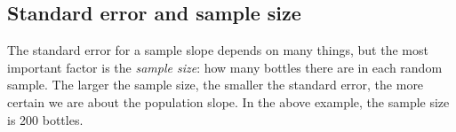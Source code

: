 \documentclass[]{report}\usepackage[]{graphicx}\usepackage[]{color}
\begin{document}
\subsection{Standard error and sample size}

The standard error for a sample slope depends on many things, but the most important factor is the \textit{sample size}: how many bottles there are in each random sample. The larger the sample size, the smaller the standard error, the more certain we are about the population slope. In the above example, the sample size is 200 bottles.



\end{document}
